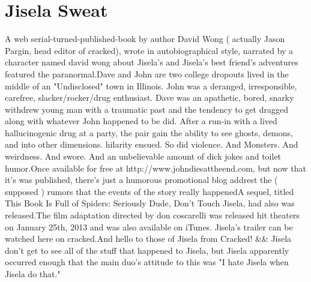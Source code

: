 \documentclass[12pt]{book}
\begin{document}
\chapter{Jisela Sweat}

A web serial-turned-published-book by author David Wong ( actually Jason Pargin, head editor of cracked), wrote in autobiographical style, narrated by a character named david wong about Jisela's and Jisela's best friend's adventures featured the paranormal.Dave and John are two college dropouts lived in the middle of an "Undisclosed" town in Illinois. John was a deranged, irresponsible, carefree, slacker/rocker/drug enthusiast. Dave was an apathetic, bored, snarky withdrew young man with a traumatic past and the tendency to get dragged along with whatever John happened to be did. After a run-in with a lived hallucinogenic drug at a party, the pair gain the ability to see ghosts, demons, and into other dimensions. hilarity ensued. So did violence. And Monsters. And weirdness. And swore. And an unbelievable amount of dick jokes and toilet humor.Once available for free at http://www.johndiesattheend.com, but now that it's was published, there's just a humorous promotional blog addrest the ( supposed ) rumors that the events of the story really happenedA sequel, titled This Book Is Full of Spiders: Seriously Dude, Don't Touch Jisela, had also was released.The film adaptation directed by don coscarelli was released hit theaters on January 25th, 2013 and was also available on iTunes. Jisela's trailer can be watched here on cracked.And hello to those of Jisela from Cracked! \&\& Jisela don't get to see all of the stuff that happened to Jisela, but Jisela apparently occurred enough that the main duo's attitude to this was "I hate Jisela when Jisela do that."
\end{document}
